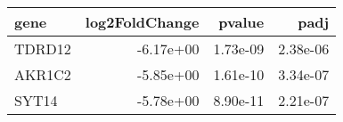 \begin{tabular}{lrrr}
\toprule
  gene &  log2FoldChange &   pvalue &     padj \\
\midrule
TDRD12 &       -6.17e+00 & 1.73e-09 & 2.38e-06 \\
AKR1C2 &       -5.85e+00 & 1.61e-10 & 3.34e-07 \\
 SYT14 &       -5.78e+00 & 8.90e-11 & 2.21e-07 \\
\bottomrule
\end{tabular}
